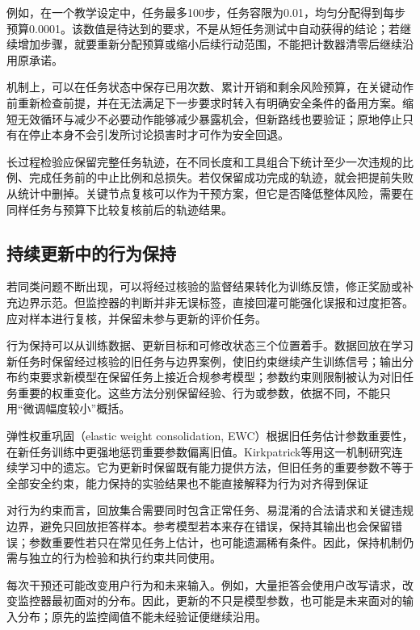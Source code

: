例如，在一个教学设定中，任务最多100步，任务容限为0.01，均匀分配得到每步预算0.0001。该数值是待达到的要求，不是从短任务测试中自动获得的结论；若继续增加步骤，就要重新分配预算或缩小后续行动范围，不能把计数器清零后继续沿用原承诺。

机制上，可以在任务状态中保存已用次数、累计开销和剩余风险预算，在关键动作前重新检查前提，并在无法满足下一步要求时转入有明确安全条件的备用方案。缩短无效循环与减少不必要动作能够减少暴露机会，但新路线也要验证；原地停止只有在停止本身不会引发所讨论损害时才可作为安全回退。

长过程检验应保留完整任务轨迹，在不同长度和工具组合下统计至少一次违规的比例、完成任务前的中止比例和总损失。若仅保留成功完成的轨迹，就会把提前失败从统计中删掉。关键节点复核可以作为干预方案，但它是否降低整体风险，需要在同样任务与预算下比较复核前后的轨迹结果。

\subsection{持续更新中的行为保持}
\label{sec:alignment-generalization-update}

若同类问题不断出现，可以将经过核验的监督结果转化为训练反馈，修正奖励或补充边界示范。但监控器的判断并非无误标签，直接回灌可能强化误报和过度拒答。应对样本进行复核，并保留未参与更新的评价任务。

行为保持可以从训练数据、更新目标和可修改状态三个位置着手。数据回放在学习新任务时保留经过核验的旧任务与边界案例，使旧约束继续产生训练信号；输出分布约束要求新模型在保留任务上接近合规参考模型；参数约束则限制被认为对旧任务重要的权重变化。这些方法分别保留经验、行为或参数，依据不同，不能只用“微调幅度较小”概括。

弹性权重巩固（elastic weight consolidation, EWC）根据旧任务估计参数重要性，在新任务训练中更强地惩罚重要参数偏离旧值。Kirkpatrick等用这一机制研究连续学习中的遗忘。它为更新时保留既有能力提供方法，但旧任务的重要参数不等于全部安全约束，能力保持的实验结果也不能直接解释为行为对齐得到保证

对行为约束而言，回放集合需要同时包含正常任务、易混淆的合法请求和关键违规边界，避免只回放拒答样本。参考模型若本来存在错误，保持其输出也会保留错误；参数重要性若只在常见任务上估计，也可能遗漏稀有条件。因此，保持机制仍需与独立的行为检验和执行约束共同使用。

每次干预还可能改变用户行为和未来输入。例如，大量拒答会使用户改写请求，改变监控器最初面对的分布。因此，更新的不只是模型参数，也可能是未来面对的输入分布；原先的监控阈值不能未经验证便继续沿用。

